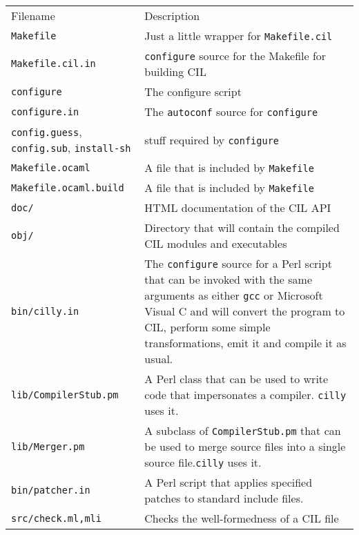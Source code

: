\documentclass{article}
\def\t#1{{\tt #1}}
\begin{document}
\begin{tabular}{ll}
Filename   & Description \\
\t{Makefile}                    & Just a little wrapper for \t{Makefile.cil} \\
\t{Makefile.cil.in}              & \t{configure} source for the 
                                  Makefile for building CIL \\
\t{configure}                   & The configure script \\
\t{configure.in}                & The \t{autoconf} source for \t{configure} \\
\t{config.guess}, \t{config.sub}, \t{install-sh} & stuff required by
                                \t{configure} \\
\t{Makefile.ocaml}              & A file that is included by \t{Makefile} \\
\t{Makefile.ocaml.build}        & A file that is included by \t{Makefile} \\
\t{doc/}                        & HTML documentation of the CIL API \\
\t{obj/}                        & Directory that will contain the compiled
                                   CIL modules and executables\\
\t{bin/cilly.in}                & The \t{configure} source for a Perl script 
                                  that can be invoked with the 
                                  same arguments as either \t{gcc} or
                                  Microsoft Visual C and will convert the
                                  program to CIL, perform some simple
                                  transformations, emit it and compile it as
                                  usual. \\
\t{lib/CompilerStub.pm}         & A Perl class that can be used to write code
                                  that impersonates a compiler. \t{cilly}
                                  uses it.  \\
\t{lib/Merger.pm}               &  A subclass of \t{CompilerStub.pm} that can
                                  be used to merge source files into a single
                                  source file.\t{cilly}
                                  uses it. \\
\t{bin/patcher.in}              & A Perl script that applies specified patches
                                  to standard include files.\\
\t{src/check.ml,mli}            & Checks the well-formedness of a CIL file \\

\end{tabular}
\end{document}
